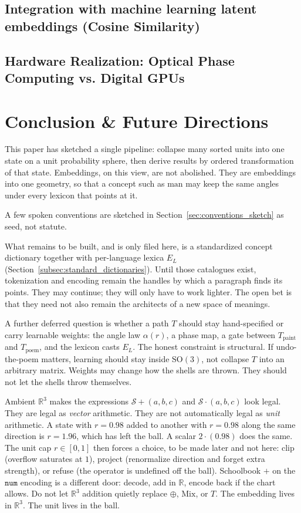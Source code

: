 \documentclass[12pt, a4paper]{article}
\begin{document}
\subsection{Integration with machine learning latent embeddings (Cosine Similarity)}
\subsection{Hardware Realization: Optical Phase Computing vs. Digital GPUs}

\section{Conclusion \& Future Directions}
\label{sec:conclusion}

This paper has sketched a single pipeline: collapse many sorted units
into one state on a unit probability sphere, then derive results by
ordered transformation of that state. Embeddings, on this view, are
not abolished. They are embeddings into one geometry, so that a
concept such as $\mathrm{man}$ may keep the same angles under every
lexicon that points at it.

A few spoken conventions are sketched in
Section~\ref{sec:conventions_sketch} as seed, not statute.

What remains to be built, and is only filed here, is a standardized
concept dictionary together with per-language lexica $E_L$
(Section~\ref{subsec:standard_dictionaries}). Until those catalogues
exist, tokenization and encoding remain the handles by which a
paragraph finds its points. They may continue; they will only have to
work lighter. The open bet is that they need not also
remain the architects of a new space of meanings.

A further deferred question is whether a path $T$ should stay
hand-specified or carry learnable weights: the angle law
$\alpha(r)$, a phase map, a gate between $T_{\mathrm{paint}}$ and
$T_{\mathrm{poem}}$, and the lexicon casts $E_L$. The honest
constraint is structural. If undo-the-poem matters, learning should
stay inside $\mathrm{SO}(3)$, not collapse $T$ into an arbitrary
matrix. Weights may change how the shells are thrown. They should
not let the shells throw themselves.

Ambient $\mathbb{R}^3$ makes the expressions
$\mathcal{S}+(a,b,c)$ and $\mathcal{S}\cdot(a,b,c)$ look legal.
They are legal as \emph{vector} arithmetic. They are not automatically
legal as \emph{unit} arithmetic. A state with $r=0.98$ added to
another with $r=0.98$ along the same direction is $r=1.96$, which
has left the ball. A scalar $2\cdot(0.98)$ does the same. The unit
cap $r\in[0,1]$ then forces a choice, to be made later and not
here: clip (overflow saturates at $1$), project (renormalize
direction and forget extra strength), or refuse (the operator is
undefined off the ball). Schoolbook $+$ on the $\mathtt{num}$
encoding is a different door: decode, add in $\mathbb{R}$, encode
back if the chart allows. Do not let $\mathbb{R}^3$ addition
quietly replace $\oplus$, $\mathrm{Mix}$, or $T$. The embedding
lives in $\mathbb{R}^3$. The unit lives in the ball.
\end{document}
